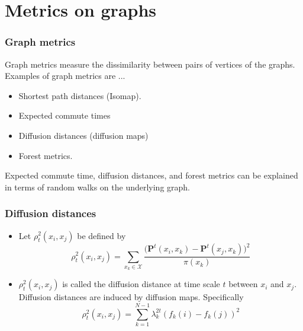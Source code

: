 \documentclass[professionalfonts, hyperref={pdfpagelabels=false,
  colorlinks=true, linkcolor=purple}]{beamer}
\begin{document}
\section{Metrics on graphs}
\begin{frame}
  \frametitle{Graph metrics}
    Graph metrics measure the dissimilarity between pairs of vertices
    of the graphs. Examples of graph metrics are ... 
  \begin{itemize}
  \item Shortest path distances (Isomap).
  \item Expected commute times
  \item Diffusion distances (diffusion maps)
  \item Forest metrics.
  \end{itemize}
 Expected commute time, diffusion distances, and forest
    metrics can be explained in terms of random walks on the
    underlying graph. 
\end{frame}
\begin{frame}[label=diffusion_distances]
  \frametitle{Diffusion distances}
  \begin{itemize}
  \item Let $\rho_{t}^{2}(x_i,x_j)$ be defined by
    \begin{equation}
      \label{eq:7}
      \rho_{t}^{2}(x_i,x_j) = \sum_{x_k \in \mathcal{X}}{
        \frac{\bigl(\bm{P}^{t}(x_i,x_k) -
          \bm{P}^{t}(x_j,x_k)\bigr)^2}{\pi(x_k)}}
    \end{equation}
  \item $\rho_{t}^2(x_i,x_j)$ is called the \alert{diffusion
      distance at time scale $t$} between $x_i$ and $x_j$. Diffusion
    distances are induced by diffusion maps. Specifically
    \begin{equation}
      \label{eq:8}
      \rho_{t}^{2}(x_i,x_j) = \sum_{k =
        1}^{N-1}{\lambda_k^{2t}(f_k(i) - f_k(j))^2} 
    \end{equation}
  \end{itemize}
\end{frame}
\end{document}
